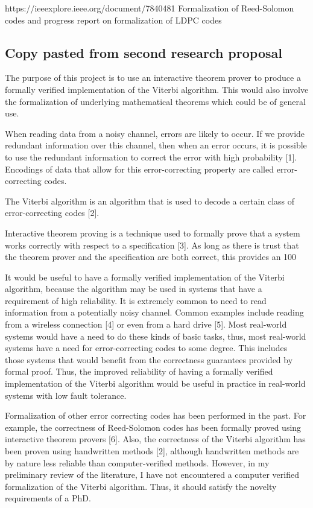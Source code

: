\documentclass{article}
\begin{document}
https://ieeexplore.ieee.org/document/7840481 Formalization of Reed-Solomon codes and progress report on formalization of LDPC codes

\subsection{Copy pasted from second research proposal}

The purpose of this project is to use an interactive theorem prover to produce a formally verified implementation of the Viterbi algorithm. This would also involve the formalization of underlying mathematical theorems which could be of general use.

When reading data from a noisy channel, errors are likely to occur. If we provide redundant information over this channel, then when an error occurs, it is possible to use the redundant information to correct the error with high probability [1]. Encodings of data that allow for this error-correcting property are called error-correcting codes.

The Viterbi algorithm is an algorithm that is used to decode a certain class of error-correcting codes [2].

Interactive theorem proving is a technique used to formally prove that a system works correctly with respect to a specification [3]. As long as there is trust that the theorem prover and the specification are both correct, this provides an 100%

It would be useful to have a formally verified implementation of the Viterbi algorithm, because the algorithm may be used in systems that have a requirement of high reliability. It is extremely common to need to read information from a potentially noisy channel. Common examples include reading from a wireless connection [4] or even from a hard drive [5]. Most real-world systems would have a need to do these kinds of basic tasks, thus, most real-world systems have a need for error-correcting codes to some degree. This includes those systems that would benefit from the correctness guarantees provided by formal proof. Thus, the improved reliability of having a formally verified implementation of the Viterbi algorithm would be useful in practice in real-world systems with low fault tolerance.

Formalization of other error correcting codes has been performed in the past. For example, the correctness of Reed-Solomon codes has been formally proved using interactive theorem provers [6]. Also, the correctness of the Viterbi algorithm has been proven using handwritten methods [2], although handwritten methods are by nature less reliable than computer-verified methods. However, in my preliminary review of the literature, I have not encountered a computer verified formalization of the Viterbi algorithm. Thus, it should satisfy the novelty requirements of a PhD. 
\end{document}
